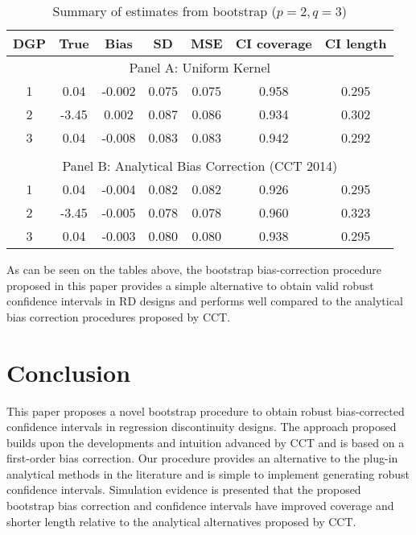 \documentclass[12pt,fleqn]{article}
\begin{document}
\begin{table}[ht]\label{Tb2}
	\caption{Summary of estimates from bootstrap ($p = 2, q = 3$)}
	\centering
	\begin{tabular}{ccccccc}
		\hline
		DGP & True & Bias & SD & MSE & CI coverage & CI length \\ 
		\hline
		\multicolumn{7}{c}{Panel A: Uniform Kernel} \\
		1 & 0.04 & -0.002 & 0.075 & 0.075 & 0.958 & 0.295 \\ 
		2 & -3.45 & 0.002 & 0.087 & 0.086 & 0.934 & 0.302 \\ 
		3 & 0.04 & -0.008 & 0.083 & 0.083 & 0.942 & 0.292 \\ 
		&&&&&& \\
		\multicolumn{7}{c}{Panel B: Analytical Bias Correction (CCT 2014)} \\
		1 & 0.04 & -0.004 & 0.082 & 0.082 & 0.926 & 0.295 \\ 		
		2 & -3.45 & -0.005 & 0.078 & 0.078 & 0.960 & 0.323 \\ 		
		3 & 0.04 & -0.003 & 0.080 & 0.080 & 0.938 & 0.295 \\ 
		\hline
	\end{tabular}
\end{table}
As can be seen on the tables above, the bootstrap bias-correction procedure
proposed in this paper provides a simple alternative to obtain valid robust
confidence intervals in RD designs and performs well compared to the analytical 
bias correction procedures proposed by CCT.


\section{Conclusion}\label{conclusion}
This paper proposes a novel bootstrap procedure to obtain robust bias-corrected
confidence intervals in regression discontinuity designs. 
The approach proposed builds upon the developments and intuition advanced by CCT and is based on a first-order bias correction.
Our procedure provides an alternative to the plug-in analytical methods in the literature and is simple to implement generating robust confidence intervals.
Simulation evidence is presented that the proposed bootstrap bias correction and confidence intervals have improved coverage and shorter length relative to the analytical alternatives proposed by CCT.


\clearpage


\end{document}
